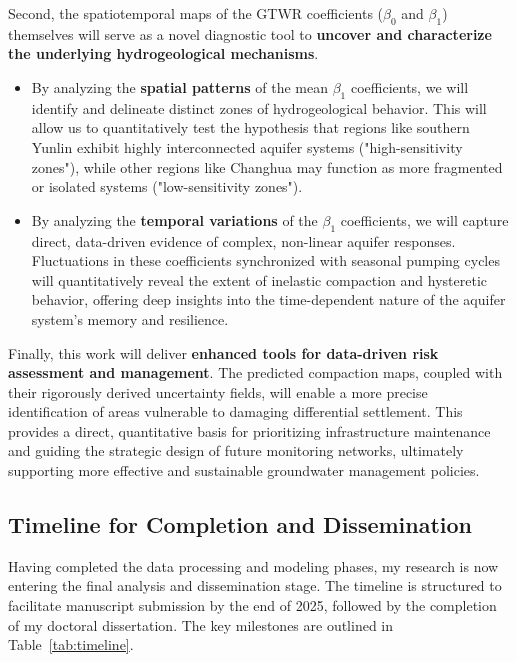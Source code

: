 \documentclass[12pt, a4paper]{article}
\begin{document}
	Second, the spatiotemporal maps of the GTWR coefficients ($\beta_{0}$ and $\beta_{1}$) themselves will serve as a novel diagnostic tool to \textbf{uncover and characterize the underlying hydrogeological mechanisms}. 
	\begin{itemize}
		\item By analyzing the \textbf{spatial patterns} of the mean $\beta_1$ coefficients, we will identify and delineate distinct zones of hydrogeological behavior. This will allow us to quantitatively test the hypothesis that regions like southern Yunlin exhibit highly interconnected aquifer systems ("high-sensitivity zones"), while other regions like Changhua may function as more fragmented or isolated systems ("low-sensitivity zones").
		\item By analyzing the \textbf{temporal variations} of the $\beta_1$ coefficients, we will capture direct, data-driven evidence of complex, non-linear aquifer responses. Fluctuations in these coefficients synchronized with seasonal pumping cycles will quantitatively reveal the extent of inelastic compaction and hysteretic behavior, offering deep insights into the time-dependent nature of the aquifer system's memory and resilience.
	\end{itemize}
	
	Finally, this work will deliver \textbf{enhanced tools for data-driven risk assessment and management}. The predicted compaction maps, coupled with their rigorously derived uncertainty fields, will enable a more precise identification of areas vulnerable to damaging differential settlement. This provides a direct, quantitative basis for prioritizing infrastructure maintenance and guiding the strategic design of future monitoring networks, ultimately supporting more effective and sustainable groundwater management policies.
	
	\subsection{Timeline for Completion and Dissemination}
	
	Having completed the data processing and modeling phases, my research is now entering the final analysis and dissemination stage. The timeline is structured to facilitate manuscript submission by the end of 2025, followed by the completion of my doctoral dissertation. The key milestones are outlined in Table~\ref{tab:timeline}.
	
\end{document}

